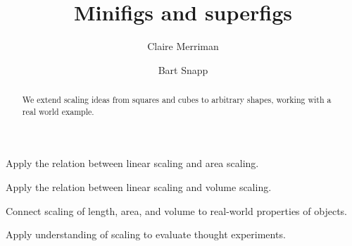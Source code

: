 \documentclass[handout,nooutcomes,noauthor,hints,12pt]{ximera}
\title{Minifigs and superfigs}
\author{Claire Merriman \and Bart Snapp}
\begin{document}
\begin{abstract}
  We extend scaling ideas from squares and cubes to arbitrary shapes,
  working with a real world example.
\end{abstract}
\maketitle

\begin{listOutcomes}
\item Apply the relation between linear scaling and area scaling.
\item Apply the relation between linear scaling and volume scaling.
\item Connect scaling of length, area, and volume to real-world properties of objects.
\item Apply understanding of scaling to evaluate thought experiments.
\end{listOutcomes}

\end{document}
